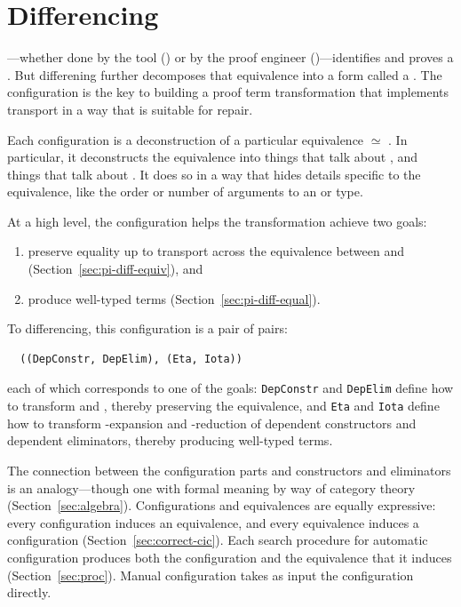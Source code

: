 \section{Differencing}
\label{sec:pi-diff}

---whether done by the tool () or by the proof engineer ()---identifies 
and proves a . But differening further decomposes that equivalence into a form called a . 
The configuration is the key to building a proof term transformation that implements transport in a way that is suitable for repair.

Each configuration is a deconstruction of a particular equivalence \Aa $\simeq$ \B.
In particular, it deconstructs the equivalence into things that talk about \Aa, and things that talk about \B.
It does so in a way that hides details
specific to the equivalence, like the order or number of arguments to an  or type.

At a high level, the configuration helps the transformation achieve two goals: 

\begin{enumerate}
\item preserve equality up to transport across the equivalence between \Aa and \B (Section~\ref{sec:pi-diff-equiv}), and 
\item produce well-typed terms (Section~\ref{sec:pi-diff-equal}).
\end{enumerate}
To differencing, this configuration is a pair of pairs:

\begin{lstlisting}
  ((DepConstr, DepElim), (Eta, Iota))
\end{lstlisting}
each of which corresponds to one of the goals:
\lstinline{DepConstr} and \lstinline{DepElim} define how to transform  and , thereby preserving the equivalence, and 
\lstinline{Eta} and \lstinline{Iota} define how to transform \intro{$\eta$}-expansion and \intro{$\iota$}-reduction of dependent constructors and dependent eliminators, thereby producing well-typed terms.

The connection between the configuration parts and constructors and eliminators is an analogy---though one with formal meaning by way of
category theory (Section~\ref{sec:algebra}).
Configurations and equivalences are equally expressive: every configuration induces an equivalence, and every equivalence induces a configuration
(Section~\ref{sec:correct-cic}).
Each search procedure for automatic configuration produces both the configuration and the equivalence that it induces (Section~\ref{sec:proc}).
Manual configuration takes as input the configuration directly.

